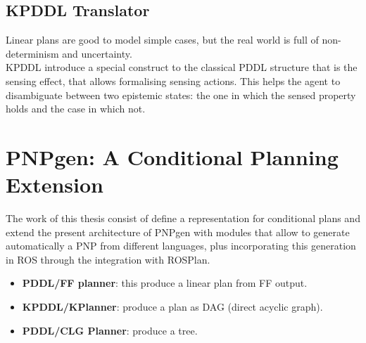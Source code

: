 \documentclass[pdftex,12pt,a4paper]{report}
\begin{document}
\subsection{KPDDL Translator}
Linear plans are good to model simple cases, but the real world is full of non-determinism and uncertainty. \\
KPDDL introduce a special construct to the classical PDDL structure that is the sensing effect, that allows formalising sensing actions. This helps the agent to disambiguate between two epistemic states: the one in which the sensed property holds and the case in which not.\\
\newline
{}

\newpage
\section{PNPgen: A Conditional Planning Extension}
The work of this thesis consist of define a representation for conditional plans  and extend the present architecture of PNPgen with modules that allow to generate automatically a PNP from different languages, plus incorporating this generation in ROS through the integration with ROSPlan. 
\begin{itemize}
\item \textbf{PDDL/FF planner}: this produce a linear plan from FF output.
\item \textbf{KPDDL/KPlanner}: produce a plan as DAG (direct acyclic graph).
\item \textbf{PDDL/CLG Planner}: produce a tree. 
\end{itemize}
\end{document}
